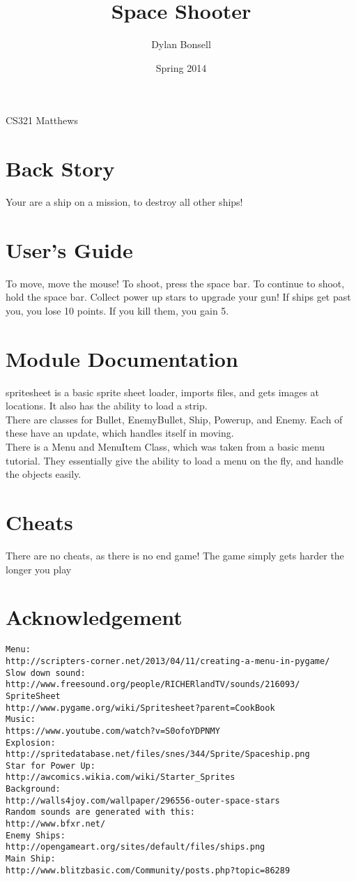 \documentclass{article}
\title{Space Shooter}
\author{Dylan Bonsell}
\date{Spring 2014}
\begin{document}
\maketitle
CS321
Matthews
\newpage
\section{Back Story}
	Your are a ship on a mission, to destroy all other ships!

\newpage
\section{User's Guide}
	To move, move the mouse! To shoot, press the space bar. To continue to shoot, hold the space bar.
	Collect power up stars to upgrade your gun!
	If ships get past you, you lose 10 points. If you kill them, you gain 5.
\newpage
\section{Module Documentation}
	spritesheet is a basic sprite sheet loader, imports files, and gets images at locations. It also has the ability to load a strip.
\\
	There are classes for Bullet, EnemyBullet, Ship, Powerup, and Enemy.
	Each of these have an update, which handles itself in moving.
\\ 
	There is a Menu and MenuItem Class, which was taken from a basic menu tutorial. They essentially give the ability to load a menu on the fly, and handle the objects easily.
\newpage
\section{Cheats}
	There are no cheats, as there is no end game! The game simply gets harder the longer you play
\newpage
\section{Acknowledgement}
\begin{verbatim}
Menu:
http://scripters-corner.net/2013/04/11/creating-a-menu-in-pygame/
Slow down sound:
http://www.freesound.org/people/RICHERlandTV/sounds/216093/
SpriteSheet
http://www.pygame.org/wiki/Spritesheet?parent=CookBook
Music:
https://www.youtube.com/watch?v=S0ofoYDPNMY
Explosion:
http://spritedatabase.net/files/snes/344/Sprite/Spaceship.png
Star for Power Up:
http://awcomics.wikia.com/wiki/Starter_Sprites
Background:
http://walls4joy.com/wallpaper/296556-outer-space-stars
Random sounds are generated with this:
http://www.bfxr.net/
Enemy Ships:
http://opengameart.org/sites/default/files/ships.png
Main Ship:
http://www.blitzbasic.com/Community/posts.php?topic=86289
\end{verbatim}
\newpage
\end{document}
